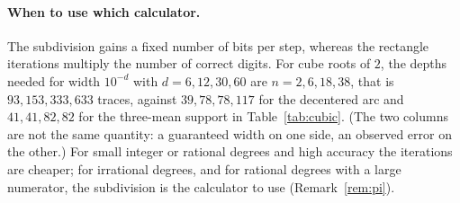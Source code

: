 \paragraph{When to use which calculator.}
The subdivision gains a fixed number of bits per step, whereas the rectangle iterations multiply the number
of correct digits. For cube roots of $2$, the depths needed for width $10^{-d}$ with $d=6,12,30,60$ are
$n=2,6,18,38$, that is $93,153,333,633$ traces, against $39,78,78,117$ for the decentered arc and
$41,41,82,82$ for the three-mean support in Table~\ref{tab:cubic}. (The two columns are not the same
quantity: a guaranteed width on one side, an observed error on the other.) For small integer or rational
degrees and high accuracy the iterations are cheaper; for irrational degrees, and for rational degrees with
a large numerator, the subdivision is the calculator to use (Remark~\ref{rem:pi}).
